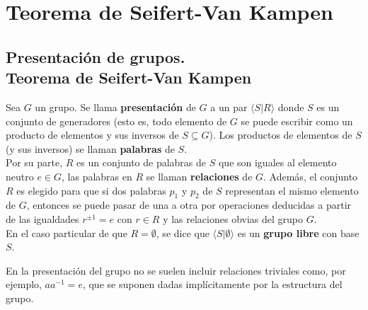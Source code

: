 \documentclass[GTSResumen.tex]{subfiles}
\begin{document}
%
\renewcommand\chaptername{\Huge Tema}
%
\titleformat{\chapter}[display]
    {\normalfont\huge\bfseries}{\chaptertitlename\ \thechapter}{10pt}{\Huge}
\titlespacing*{\chapter}{0pt}{-1cm}{10pt}
%
%
%


\setcounter{chapter}{4}

\chapter{Teorema de Seifert-Van Kampen}
\section{Presentación de grupos.\\ Teorema de Seifert-Van Kampen}
\begin{defi}
Sea $G$ un grupo. Se llama \textbf{presentación} de $G$ a un par $\langle S|R\rangle$ donde $S$ es un conjunto de generadores (esto es, todo elemento de $G$ se puede escribir como un producto de elementos y sus inversos de $S\subseteq G$). Los productos de elementos de $S$ (y sus inversos) se llaman \textbf{palabras} de $S$.\\
Por su parte, $R$ es un conjunto de palabras de $S$ que son iguales al elemento neutro $e\in G$, las palabras en $R$ se llaman \textbf{relaciones} de $G$. Además, el conjunto $R$ es elegido para que si dos palabras $p_1$ y $p_2$ de $S$ representan el mismo elemento de $G$, entonces se puede pasar de una a otra por operaciones deducidas a partir de las igualdades $r^{\pm1} = e$ con $r\in R$ y las relaciones obvias del grupo $G$. \\
En el caso particular de que $R=\emptyset$, se dice que $\langle S|\emptyset\rangle$ es un \textbf{grupo libre} con base $S$.
\end{defi}

\begin{nota}
En la presentación del grupo no se suelen incluir relaciones triviales como, por ejemplo, $aa^{-1}=e$, que se suponen dadas implícitamente por la estructura del grupo.
\end{nota}
\end{document}
